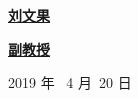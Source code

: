 \begin{flushleft}
	{\kaishu\underline{\hspace{1.8cm}\textbf{刘文果}\hspace{3.5cm}} }                         \\
	\vspace{10bp}
	
	{\kaishu\underline{\hspace{3.2cm}\textbf{副教授}\hspace{3.8cm}} }                         \\
	
\end{flushleft}

\vskip 4cm

\centerline{ 2019 年 \  4 月\  20 日}